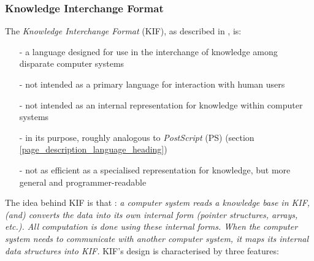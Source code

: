 %
%
%
%
%
%
%

\subsubsection{Knowledge Interchange Format}
\label{knowledge_interchange_format_heading}

The \emph{Knowledge Interchange Format} (KIF), as described in \cite{kif}, is:

\begin{itemize}
    \item[-] a language designed for use in the interchange of knowledge among
        disparate computer systems
    \item[-] not intended as a primary language for interaction with human users
    \item[-] not intended as an internal representation for knowledge within
        computer systems
    \item[-] in its purpose, roughly analogous to \emph{PostScript} (PS)
        (section \ref{page_description_language_heading})
    \item[-] not as efficient as a specialised representation for knowledge,
        but more general and programmer-readable
\end{itemize}

The idea behind KIF is that \cite{kif}: \textit{a computer system reads a
knowledge base in KIF, (and) converts the data into its own internal form
(pointer structures, arrays, etc.). All computation is done using these
internal forms. When the computer system needs to communicate with another
computer system, it maps its internal data structures into KIF.} KIF's design
is characterised by three features:

